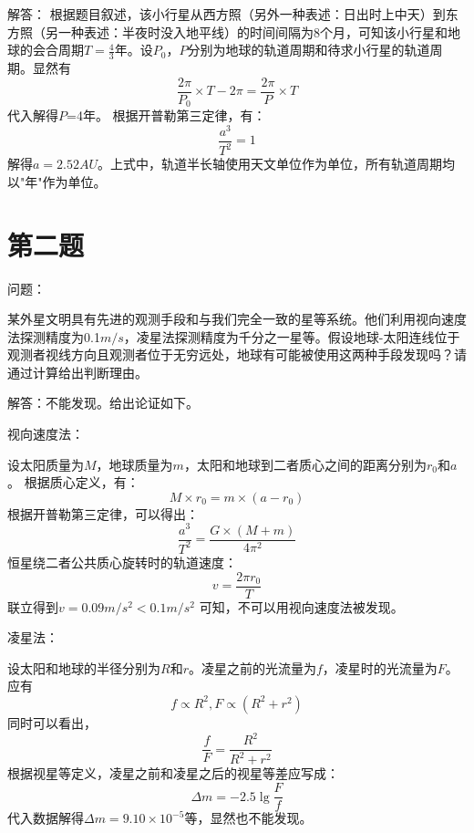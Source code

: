 \documentclass[a4paper,12pt]{report}
\begin{document}
\noindent 解答：
根据题目叙述，该小行星从西方照（另外一种表述：日出时上中天）到东方照（另一种表述：半夜时没入地平线）的时间间隔为8个月，可知该小行星和地球的会合周期$T=\frac{4}{3}$年。设$P_{0}$，$P$分别为地球的轨道周期和待求小行星的轨道周期。显然有
\begin{equation}\label{eq1}
	\frac{2\pi}{P_{0}}\times{T}-2\pi=\frac{2\pi}{P}\times{T}
\end{equation}
代入解得$P$=4年。
根据开普勒第三定律，有：
\begin{equation}\label{eq2}
	\frac{a^3}{T^2}=1
\end{equation}
解得$a=2.52AU$。上式中，轨道半长轴使用天文单位作为单位，所有轨道周期均以"年"作为单位。
\section{第二题}
\noindent 问题：

某外星文明具有先进的观测手段和与我们完全一致的星等系统。他们利用视向速度法探测精度为0.1$m/s$，凌星法探测精度为千分之一星等。假设地球-太阳连线位于观测者视线方向且观测者位于无穷远处，地球有可能被使用这两种手段发现吗？请通过计算给出判断理由。

\noindent 解答：不能发现。给出论证如下。

视向速度法：

设太阳质量为$M$，地球质量为$m$，太阳和地球到二者质心之间的距离分别为$r_{0}$和$a$。
根据质心定义，有：
\begin{equation}\label{eq3}
	M\times{r_{0}}=m\times{(a-r_{0})}
\end{equation}
根据开普勒第三定律，可以得出：
\begin{equation}\label{eq4}
	\frac{a^3}{T^2}=\frac{G\times(M+m)}{4\pi^2}
\end{equation}
恒星绕二者公共质心旋转时的轨道速度：
\begin{equation}\label{eq5}
	v=\frac{2\pi{r_{0}}}{T}
\end{equation}
联立得到$v=0.09m/{s}^2<0.1m/{s}^2$
可知，不可以用视向速度法被发现。

凌星法：

设太阳和地球的半径分别为$R$和$r$。凌星之前的光流量为$f$，凌星时的光流量为$F$。应有
\begin{equation}\label{eq6}
	f\propto{R^2},F\propto{(R^2+r^2)}
\end{equation}
同时可以看出，
\begin{equation}\label{eq7}
	\frac{f}{F}=\frac{R^2}{R^2+r^2}
\end{equation}
根据视星等定义，凌星之前和凌星之后的视星等差应写成：
\begin{equation}\label{eq8}
	\Delta m=-2.5\lg\frac{F}{f}
\end{equation}
代入数据解得$\Delta m=9.10\times{10^{-5}}$等，显然也不能发现。
\end{document}
